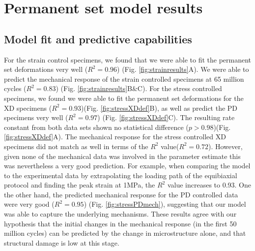 \section{Permanent set model results}
\subsection{Model fit and predictive capabilities}


	For the strain control specimens, we found that we were able to fit the permanent set deformations very well ($R^2 = 0.96$) (Fig. \ref{fig:strainresults}A). We were able to predict the mechanical response of the strain controlled specimens at 65 million cycles ($R^2 = 0.83$) (Fig. \ref{fig:strainresults}B\&C). 
	For the stress controlled specimens, we found we were able to fit the permanent set deformations for the XD specimens ($R^2 = 0.93$)(Fig. \ref{fig:stressXDdef}B), as well as predict the PD specimens very well ($R^2 = 0.97$) (Fig. \ref{fig:stressXDdef}C). 
	The resulting rate constant from both data sets shown no statistical difference ($p > 0.98$)(Fig. \ref{fig:stressXDdef}A). 
The mechanical response for the stress controlled XD specimens did not match as well in terms of the $R^2$ value($R^2 = 0.72$). 
	However, given none of the mechanical data was involved in the parameter estimate this was nevertheless a very good prediction. 
	For example, when comparing the model to the experimental data by extrapolating the loading path of the equibiaxial protocol and finding the peak strain at 1MPa, the $R^2$ value increases to 0.93. 
	One the other hand, the predicted mechanical response for the PD controlled data were very good ($R^2 = 0.95$) (Fig. \ref{fig:stressPDmech}), suggesting that our model was able to capture the underlying mechanisms. 
	These results agree with our hypothesis that the initial changes in the mechanical response (in the first 50 million cycles) can be predicted by the change in microstructure alone, and that structural damage is low at this stage. 
